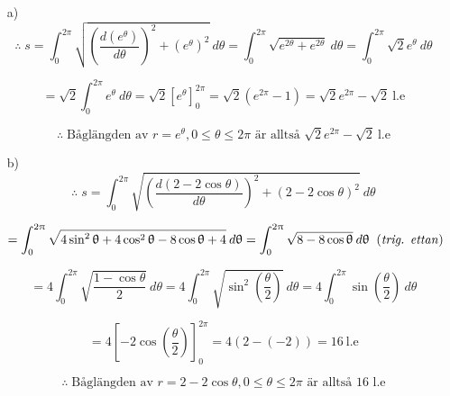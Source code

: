 \documentclass{article}
\begin{document}
\begin{enumerate}
    \item[a)] 
        $$
        \therefore
        \;
        s
        =
        \int_{0}^{2\pi} \sqrt{(\frac{d(e^{\theta})}{d\theta})^2+(e^{\theta})^2} \: d\theta
        =
        \int_{0}^{2\pi} \sqrt{e^{2\theta}+e^{2\theta}} \: d\theta
        =
        \int_{0}^{2\pi} \sqrt{2}e^{\theta} \: d\theta
        $$

        $$
        =
        \sqrt{2}
        \int_{0}^{2\pi} e^{\theta} \: d\theta
        =
        \sqrt{2}
        \left[e^\theta \right]_{0}^{2\pi}
        =
        \sqrt{2}
        (e^{2\pi} - 1)
        =
        \sqrt{2}e^{2\pi}-\sqrt{2} \: \text{l.e}
        $$

        $$
        \therefore
        \;
        \text{Båglängden av $r=e^{\theta}, 0\leq\theta\leq2\pi$ är alltså $\sqrt{2}e^{2\pi}-\sqrt{2} \: \text{l.e}$}
        $$

    \item[b)]
        $$
        \therefore
        \;
        s
        =
        \int_{0}^{2\pi} \sqrt{(\frac{d(2-2\cos\theta)}{d\theta})^2+(2-2\cos\theta)^2} \: d\theta
        $$

        $$
        =
        \int_{0}^{2\pi} \sqrt{4\sin^2\theta+4\cos^2\theta-8\cos\theta+4} \: d\theta
        =
        \int_{0}^{2\pi} \sqrt{8-8\cos\theta} \: d\theta
        \;\;
        \text{(\emph{trig. ettan})}
        $$

        $$
        = 
        4
        \int_{0}^{2\pi} \sqrt{\frac{1-\cos\theta}{2}} \: d\theta
        =
        4
        \int_{0}^{2\pi} \sqrt{\sin^2(\frac{\theta}{2})} \: d\theta
        =
        4
        \int_{0}^{2\pi} \sin(\frac{\theta}{2}) \: d\theta
        $$

        $$
        =
        4
        \left[-2\cos(\frac{\theta}{2}) \right]_{0}^{2\pi}
        =
        4
        (2-(-2))
        =
        16 \: \text{l.e}
        $$

        $$
        \therefore
        \;
        \text{Båglängden av $r=2-2\cos\theta, 0\leq\theta\leq2\pi$ är alltså 16 l.e}
        $$

\end{enumerate}
\end{document}
